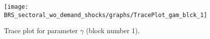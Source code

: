 \begin{figure}[H]
\centering
  \texttt{[image: BRS\_sectoral\_wo\_demand\_shocks/graphs/TracePlot\_gam\_blck\_1]}\\
    \caption{Trace plot for parameter $\gamma$ (block number 1).}
\end{figure}
